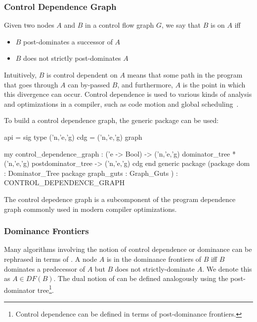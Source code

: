 \subsubsection{Control Dependence Graph}
Given two nodes $A$ and $B$ in a control flow graph $G$, 
we say that $B$ is  on $A$ iff
\begin{itemize}
  \item $B$ post-dominates a successor of $A$
  \item $B$ does not strictly post-dominates $A$
\end{itemize}
Intuitively, $B$ is control dependent on $A$ means that
some path in the program that goes through $A$ can by-passed $B$,
and furthermore, $A$ is the point in which this divergence can occur.
Control dependence is used to various kinds of analysis and optimizations in
a compiler, such as code motion and global scheduling~\cite{bernstein-rodeh}.

To build a control dependence graph, the generic package
 can be used:
\begin{SML}
 api  = sig
    type ('n,'e,'g) cdg = ('n,'e,'g) graph

    my control_dependence_graph :
          ('e -> Bool) ->
          ('n,'e,'g) dominator_tree *
          ('n,'e,'g) postdominator_tree ->
          ('n,'e,'g) cdg
 end
 generic package 
    (package dom : Dominator_Tree
     package graph_guts : Graph_Guts
    ) : CONTROL_DEPENDENCE_GRAPH
\end{SML}
The control depedence graph is a subcomponent of the
program dependence graph commonly used in
modern compiler optimizations.

\subsubsection{Dominance Frontiers}

Many algorithms involving the notion of control dependence or dominance
can be rephrased in terms of .
A node $A$ is in the dominance frontiers of $B$ iff
$B$ dominates a predecessor of $A$ but $B$ does not strictly-dominate $A$.
We denote this as $A \in DF(B)$. 
The dual notion of  can be defined
analogously using the post-dominator tree\footnote{Control dependence
can be defined in terms of post-dominance frontiers.}.  

